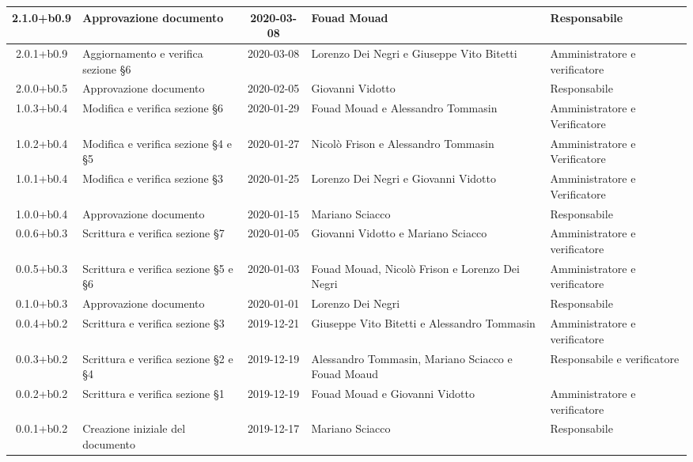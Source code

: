 \begin{center}
\begin{longtable}{|c|p{3.5cm}|c|p{3cm}|p{3cm}|}
	2.1.0+b0.9 & Approvazione documento & 2020-03-08 & Fouad Mouad & Responsabile \\
	\hline
	2.0.1+b0.9 & Aggiornamento e verifica sezione \S6  & 2020-03-08 & Lorenzo Dei Negri e Giuseppe Vito Bitetti & Amministratore e verificatore \\
	\hline
	2.0.0+b0.5 & Approvazione documento & 2020-02-05 & Giovanni Vidotto & Responsabile \\
	\hline 
	1.0.3+b0.4 & Modifica e verifica sezione \S6 & 2020-01-29 & Fouad Mouad e Alessandro Tommasin & Amministratore e Verificatore \\
	\hline
	1.0.2+b0.4 & Modifica e verifica sezione \S4 e \S5 & 2020-01-27 & Nicolò Frison e Alessandro Tommasin & Amministratore e Verificatore \\
	\hline
	1.0.1+b0.4 & Modifica e verifica sezione \S3 & 2020-01-25 & Lorenzo Dei Negri e Giovanni Vidotto & Amministratore e Verificatore \\
	\hline
	1.0.0+b0.4 & Approvazione documento & 2020-01-15 & Mariano Sciacco & Responsabile \\
	\hline 
	0.0.6+b0.3 & Scrittura e verifica sezione \S7  & 2020-01-05 & Giovanni Vidotto e Mariano Sciacco & Amministratore e verificatore \\
	\hline 
	0.0.5+b0.3 & Scrittura e verifica sezione \S5 e \S6  & 2020-01-03 & Fouad Mouad, Nicolò Frison e Lorenzo Dei Negri & Amministratore e verificatore \\
	\hline
	0.1.0+b0.3 & Approvazione documento & 2020-01-01 & Lorenzo Dei Negri & Responsabile \\ 
	\hline
	0.0.4+b0.2 & Scrittura e verifica sezione \S3 & 2019-12-21 & Giuseppe Vito Bitetti e Alessandro Tommasin & Amministratore e verificatore \\
	\hline 
	0.0.3+b0.2 & Scrittura e verifica sezione \S2 e \S4 & 2019-12-19 & Alessandro Tommasin, Mariano Sciacco e Fouad Moaud & Responsabile e verificatore \\
	\hline 
	0.0.2+b0.2 & Scrittura e verifica sezione \S1 & 2019-12-19 & Fouad Mouad e Giovanni Vidotto & Amministratore e verificatore \\
	\hline 
	0.0.1+b0.2 & Creazione iniziale del documento & 2019-12-17 & Mariano Sciacco & Responsabile \\
	\hline
	

	\end{longtable}
\end{center}